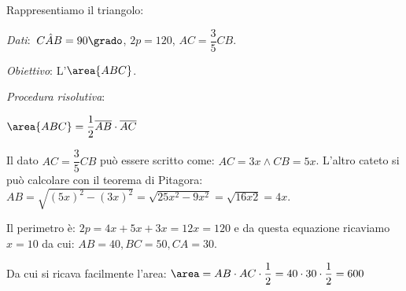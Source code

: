 Rappresentiamo il triangolo:

\begin{htmulticols}{2}

\emph{Dati}:~\(C\hat{{A}}B=90\grado\), \(2p= 120\), \(AC=\dfrac{3}{5}CB\).

\emph{Obiettivo}: L'\(\area{ABC}\).

\emph{Procedura risolutiva}:

\hspace{10mm}
\(\area{ABC} =\dfrac{1}{2}\overline{AB} \cdot \overline{AC}\)

\begin{center}
%  
\triangolo
\end{center}
\end{htmulticols}

Il dato \(AC=\dfrac{3}{5}CB\) può essere scritto come: \(AC=3x \wedge CB=5x\).
L'altro cateto si può calcolare con il teorema di Pitagora:
\(AB=\sqrt{(5x)^2-(3x)^2}=\sqrt{25x^2-9x^2}=\sqrt{16x2}=4x\).

Il perimetro è: \(2p=4x+5x+3x=12x=120\) e da questa equazione ricaviamo 
\(x=10\) da cui: \(AB=40, BC=50, CA=30\). 

Da cui si ricava facilmente l'area: 
\(\area = AB \cdot AC \cdot \dfrac{1}{2} = 
40 \cdot 30 \cdot \dfrac{1}{2} =600\)
